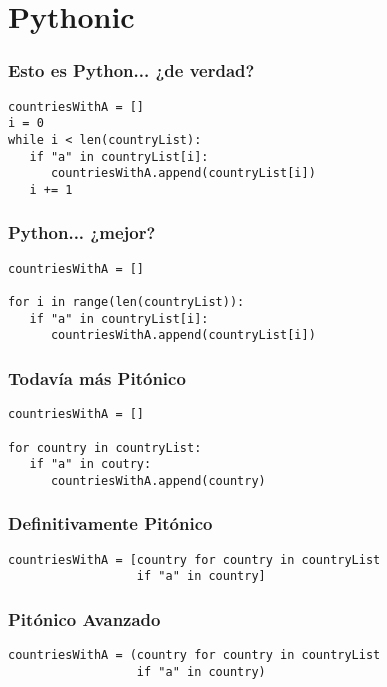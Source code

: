 \section{Pythonic}

\begin{frame}[fragile]
\frametitle{Esto es Python... ¿de verdad?}

\begin{verbatim}
countriesWithA = []
i = 0
while i < len(countryList):
   if "a" in countryList[i]:
      countriesWithA.append(countryList[i])
   i += 1
\end{verbatim}

\end{frame}


\begin{frame}[fragile]
\frametitle{Python... ¿mejor?}

\begin{verbatim}
countriesWithA = []
    
for i in range(len(countryList)):
   if "a" in countryList[i]:
      countriesWithA.append(countryList[i])
\end{verbatim}

\end{frame}


\begin{frame}[fragile]
\frametitle{Todavía más Pitónico}

\begin{verbatim}
countriesWithA = []

for country in countryList:
   if "a" in coutry:
      countriesWithA.append(country)
\end{verbatim}


\end{frame}


\begin{frame}[fragile]
\frametitle{Definitivamente Pitónico}

\begin{verbatim}
countriesWithA = [country for country in countryList 
                  if "a" in country]
\end{verbatim}

\end{frame}


\begin{frame}[fragile]
\frametitle{Pitónico Avanzado}

\begin{verbatim}
countriesWithA = (country for country in countryList
                  if "a" in country)
\end{verbatim}


\end{frame}


